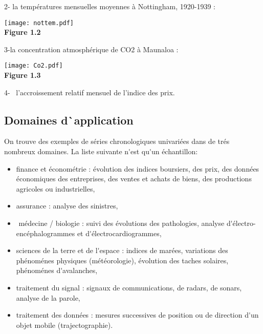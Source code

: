 \documentclass[a4paper,12pt,freqn]{report}
\theoremstyle{plain}
\begin{document}
2- la temp\'{e}ratures mensuelles moyennes \`{a} Nottingham, 1920-1939 :


\begin{center}
  \texttt{[image: nottem.pdf]}\\
  \textbf{Figure 1.2}
\end{center}

3-la concentration atmosph\'{e}rique de CO2 \`{a} Maunaloa :


\begin{center}
  \texttt{[image: Co2.pdf]}\\
\textbf{Figure 1.3}
\end{center}
4- \ l'accroissement relatif mensuel de l'indice des prix.

\subsection{Domaines d\`{}application}
On trouve des exemples de s\'{e}ries chronologiques univari\'{e}es dans de tr\'{e}s nombreux domaines.
La liste suivante n\'{}est qu\'{}un \'{e}chantillon:
\begin{itemize}

  \item finance et \'{e}conom\'{e}trie : \'{e}volution des indices boursiers, des prix, des donn\'{e}es \'{e}conomiques
des entreprises, des ventes et achats de biens, des productions agricoles ou industrielles,
  \item assurance : analyse des sinistres,

  \item  m\'{e}decine / biologie : suivi des \'{e}volutions des pathologies, analyse d\'{}\'{e}lectro-enc\'{e}phalogrammes
et d\'{}\'{e}lectrocardiogrammes,

  \item sciences de la terre et de l\'{}espace : indices de mar\'{e}es, variations des ph\'{e}nom\'{e}nes physiques
(m\'{e}t\'{e}orologie), \'{e}volution des taches solaires, ph\'{e}nom\'{e}nes d\'{}avalanches,
  \item traitement du signal : signaux de communications, de radars, de sonars, analyse de la parole,

  \item traitement des donn\'{e}es : mesures successives de position ou de direction d\'{}un objet mobile (trajectographie).
\end{itemize}
\end{document}
